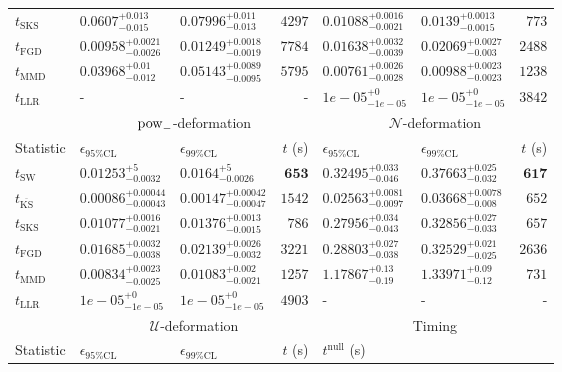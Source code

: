 \begin{tabular}{l|llr|llr}
	$t_{\mathrm{SKS}}$ & $0.0607_{-0.015}^{+0.013}$ & $0.07996_{-0.013}^{+0.011}$ & $4297$ & $0.01088_{-0.0021}^{+0.0016}$ & $0.0139_{-0.0015}^{+0.0013}$ & $773$ \\
	$t_{\mathrm{FGD}}$ & ${\mathbf{0.00958_{-0.0026}^{+0.0021}}}$ & ${\mathbf{0.01249_{-0.0019}^{+0.0018}}}$ & $7784$ & $0.01638_{-0.0039}^{+0.0032}$ & $0.02069_{-0.003}^{+0.0027}$ & $2488$ \\
	$t_{\mathrm{MMD}}$ & $0.03968_{-0.012}^{+0.01}$ & $0.05143_{-0.0095}^{+0.0089}$ & $5795$ & $0.00761_{-0.0028}^{+0.0026}$ & $0.00988_{-0.0023}^{+0.0023}$ & $1238$ \\
	$t_{\mathrm{LLR}}$ & - & - & - & $1e-05_{-1e-05}^{+0}$ & $1e-05_{-1e-05}^{+0}$ & $3842$ \\
	\toprule
	\multicolumn{1}{c}{} & \multicolumn{3}{c}{$\rm{pow}_{-}$-deformation} & \multicolumn{3}{c}{$\mathcal{N}$-deformation} \\
	Statistic & $\epsilon_{95\%\mathrm{CL}}$ & $\epsilon_{99\%\mathrm{CL}}$ & $t$ (s) & $\epsilon_{95\%\mathrm{CL}}$ & $\epsilon_{99\%\mathrm{CL}}$ & $t$ (s) \\
	\midrule
	$t_{\mathrm{SW}}$ & $0.01253_{-0.0032}^{+5}$ & $0.0164_{-0.0026}^{+5}$ & ${\mathbf{653}}$ & $0.32495_{-0.046}^{+0.033}$ & $0.37663_{-0.032}^{+0.025}$ & ${\mathbf{617}}$ \\
	$t_{\overline{\mathrm{KS}}}$ & ${\mathbf{0.00086_{-0.00043}^{+0.00044}}}$ & ${\mathbf{0.00147_{-0.00047}^{+0.00042}}}$ & $1542$ & ${\mathbf{0.02563_{-0.0097}^{+0.0081}}}$ & ${\mathbf{0.03668_{-0.008}^{+0.0078}}}$ & $652$ \\
	$t_{\mathrm{SKS}}$ & $0.01077_{-0.0021}^{+0.0016}$ & $0.01376_{-0.0015}^{+0.0013}$ & $786$ & $0.27956_{-0.043}^{+0.034}$ & $0.32856_{-0.033}^{+0.027}$ & $657$ \\
	$t_{\mathrm{FGD}}$ & $0.01685_{-0.0038}^{+0.0032}$ & $0.02139_{-0.0032}^{+0.0026}$ & $3221$ & $0.28803_{-0.038}^{+0.027}$ & $0.32529_{-0.025}^{+0.021}$ & $2636$ \\
	$t_{\mathrm{MMD}}$ & $0.00834_{-0.0025}^{+0.0023}$ & $0.01083_{-0.0021}^{+0.002}$ & $1257$ & $1.17867_{-0.19}^{+0.13}$ & $1.33971_{-0.12}^{+0.09}$ & $731$ \\
	$t_{\mathrm{LLR}}$ & $1e-05_{-1e-05}^{+0}$ & $1e-05_{-1e-05}^{+0}$ & $4903$ & - & - & - \\
	\toprule
	\multicolumn{1}{c}{} & \multicolumn{3}{c}{$\mathcal{U}$-deformation} & \multicolumn{3}{c}{Timing} \\
	Statistic & $\epsilon_{95\%\mathrm{CL}}$ & $\epsilon_{99\%\mathrm{CL}}$ & $t$ (s) & $t^{\mathrm{null}}$ (s) \\

\end{tabular}
